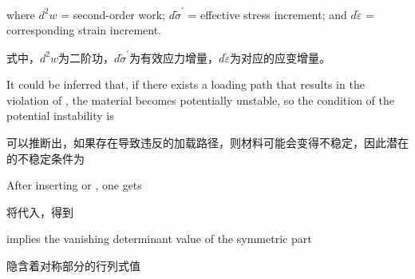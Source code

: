 \begin{ParaColumn}
    \noindent
    where $d^{2} w$ = second-order work; $d \widetilde{\sigma}^{\prime}$ = effective stress increment; and $d \tilde{\varepsilon}$ = corresponding strain increment.

    \switchcolumn

    \noindent
    式中，$d^{2} w$为二阶功，$d \widetilde{\sigma}^{\prime}$为有效应力增量，$d \tilde{\varepsilon}$为对应的应变增量。

    \switchcolumn*

    It could be inferred that, if there exists a loading path that results in the violation of , the material becomes potentially unstable, so the condition of the potential instability is

    \switchcolumn

    可以推断出，如果存在导致违反的加载路径，则材料可能会变得不稳定，因此潜在的不稳定条件为


    \switchcolumn*

    \noindent
    After inserting  or , one gets

    \switchcolumn

    \noindent
    将代入，得到

    \switchcolumn*

    \noindent
    implies the vanishing determinant value of the symmetric part

    \switchcolumn

    \noindent
    隐含着对称部分的行列式值

    \switchcolumn*


\end{ParaColumn}
